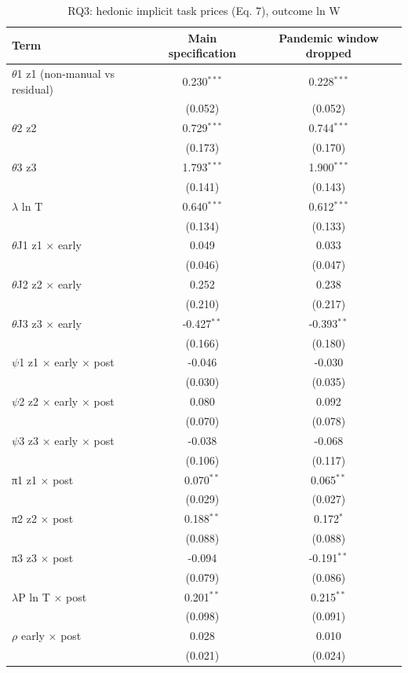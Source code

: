 \begin{table}[htbp]\centering
\caption{RQ3: hedonic implicit task prices (Eq. 7), outcome ln W}
\begin{tabular}{lcc}
\toprule
Term & Main specification & Pandemic window dropped \\
\midrule
$\theta$1  z1 (non-manual vs residual) & 0.230$^{***}$ & 0.228$^{***}$ \\
 & (0.052) & (0.052) \\
$\theta$2  z2 & 0.729$^{***}$ & 0.744$^{***}$ \\
 & (0.173) & (0.170) \\
$\theta$3  z3 & 1.793$^{***}$ & 1.900$^{***}$ \\
 & (0.141) & (0.143) \\
$\lambda$  ln T & 0.640$^{***}$ & 0.612$^{***}$ \\
 & (0.134) & (0.133) \\
$\theta$J1  z1 $\times$ early & 0.049 & 0.033 \\
 & (0.046) & (0.047) \\
$\theta$J2  z2 $\times$ early & 0.252 & 0.238 \\
 & (0.210) & (0.217) \\
$\theta$J3  z3 $\times$ early & -0.427$^{**}$ & -0.393$^{**}$ \\
 & (0.166) & (0.180) \\
$\psi$1  z1 $\times$ early $\times$ post & -0.046 & -0.030 \\
 & (0.030) & (0.035) \\
$\psi$2  z2 $\times$ early $\times$ post & 0.080 & 0.092 \\
 & (0.070) & (0.078) \\
$\psi$3  z3 $\times$ early $\times$ post & -0.038 & -0.068 \\
 & (0.106) & (0.117) \\
π1  z1 $\times$ post & 0.070$^{**}$ & 0.065$^{**}$ \\
 & (0.029) & (0.027) \\
π2  z2 $\times$ post & 0.188$^{**}$ & 0.172$^{*}$ \\
 & (0.088) & (0.088) \\
π3  z3 $\times$ post & -0.094 & -0.191$^{**}$ \\
 & (0.079) & (0.086) \\
$\lambda$P  ln T $\times$ post & 0.201$^{**}$ & 0.215$^{**}$ \\
 & (0.098) & (0.091) \\
$\rho$  early $\times$ post & 0.028 & 0.010 \\
 & (0.021) & (0.024) \\
\bottomrule
\end{tabular}
\par\vspace{2pt}{\footnotesize State-by-quarter, industry and education fixed effects; controls sex and age. Standard errors clustered on occupation in parentheses. * p<0.10, ** p<0.05, *** p<0.01. Holm-adjusted p for $\psi$1-$\psi$3 (main specification): $\psi$1 0.370, $\psi$2 0.509, $\psi$3 0.720. Not shown because identical to the main specification (Eq. 7 does not use exposure): GPT-4-rated exposure, LM-AIOE exposure.}
\end{table}
